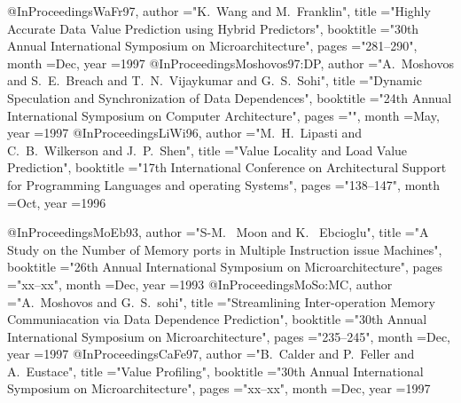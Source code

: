 @InProceedings{WaFr97,
        author          ="K.~Wang and M.~Franklin",
        title           ="Highly Accurate Data Value Prediction using Hybrid
                          Predictors",
        booktitle       ="30th Annual International Symposium on
                          Microarchitecture",
        pages           ="281--290",
        month           =Dec,
        year            =1997
}
@InProceedings{Moshovos97:DP,
        author          ="A.~Moshovos and S.~E.~Breach and T.~N.~Vijaykumar and
                          G.~S.~Sohi",
        title           ="Dynamic Speculation and Synchronization of Data
                          Dependences",
        booktitle       ="24th Annual International Symposium on
                          Computer Architecture",
        pages           ="",
        month           =May,
        year            =1997
}
@InProceedings{LiWi96,
        author          ="M.~H.~Lipasti and C.~B.~Wilkerson and J.~P.~Shen",
        title           ="Value Locality and Load Value Prediction",
        booktitle       ="17th International Conference on Architectural Support
                          for Programming Languages and operating Systems",
        pages           ="138--147",
        month           =Oct,
        year            =1996
}


@InProceedings{MoEb93,
        author          ="S-M. ~Moon and K. ~Ebcioglu",
        title           ="A Study on the Number of Memory ports in
                          Multiple Instruction issue Machines",
        booktitle       ="26th Annual International Symposium on
                          Microarchitecture",
        pages           ="xx--xx",
        month           =Dec,
        year            =1993
}
@InProceedings{MoSo:MC,
        author          ="A.~Moshovos and G.~S.~sohi",
        title           ="Streamlining Inter-operation Memory Communiacation
                          via Data Dependence Prediction",
        booktitle       ="30th Annual International Symposium on
                          Microarchitecture",
        pages           ="235--245",
        month           =Dec,
        year            =1997
}
@InProceedings{CaFe97,
        author          ="B.~Calder and P.~Feller and A.~Eustace",
        title           ="Value Profiling",
        booktitle       ="30th Annual International Symposium on
                          Microarchitecture",
        pages           ="xx--xx",
        month           =Dec,
        year            =1997
}


